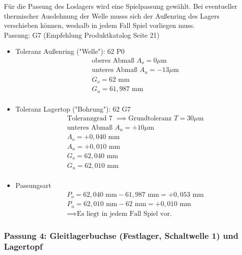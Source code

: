 Für die Passung des Loslagers wird eine Spielpassung gewählt. Bei eventueller thermischer Ausdehnung der Welle musss sich der Außenring des Lagers verschieben können, weshalb in jedem Fall Spiel vorliegen muss. \\ 
Passung: G7 (Empfehlung Produktkatalog Seite 21)
\begin{itemize}
	\item Toleranz Außenring ("Welle"): 62 P0 
	\begin{align*}
	&\text{oberes Abmaß } A_o = 0 \mu\text{m} \\
	&\text{unteres Abmaß } A_u = -13 \mu\text{m} \\
	&G_o = 62 \text{ mm} \\
	&G_u = 61,987 \text{ mm}\\
	\end{align*} 
	\item Toleranz Lagertop ("Bohrung"): 62 G7
	\begin{align*}
	&\text{Toleranzgrad 7 } \implies \text{Grundtoleranz } T=30 \mu\text{m} \\
	&\text{unteres Abmaß } A_u = +10 \mu\text{m} \\
	&A_o = +0,040 \text{ mm} \\
	&A_u = +0,010 \text{ mm} \\
	&G_o = 62,040 \text{ mm} \\
	&G_u = 62,010 \text{ mm}\\
	\end{align*} 
	\item Passungsart
	\begin{align*}
	&P_o = 62,040 \text{ mm} - 61,987 \text{ mm} = +0,053 \text{ mm} \\
	&P_u =62,010 \text{ mm} - 62 \text{ mm} = +0,010 \text{ mm}\\
	&\implies \text{Es liegt in jedem Fall Spiel vor.}
	\end{align*} 
\end{itemize}
\newpage


\subsubsection{Passung 4: Gleitlagerbuchse (Festlager, Schaltwelle 1) und Lagertopf}

